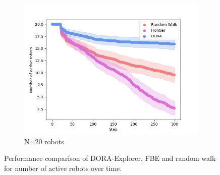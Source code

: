 \documentclass[letterpaper, 10 pt, conference]{ieeeconf}
\begin{document}
\begin{figure}
\begin{subfigure}{0.32\textwidth}
        \includegraphics[width=\textwidth]{images/activerobots_20.png}
        \caption{N=20 robots}
        \label{results:failures20}
    \end{subfigure}
    \caption{Performance comparison of DORA-Explorer, FBE and random walk for number of active robots over time.}
\end{figure}
\end{document}
